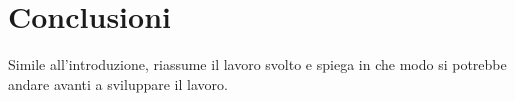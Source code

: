 \section{Conclusioni}

Simile all'introduzione, riassume il lavoro svolto e spiega in che
modo si potrebbe andare avanti a sviluppare il lavoro.
